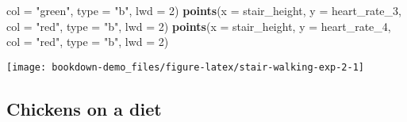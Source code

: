 \documentclass[]{book}
\newenvironment{Shaded}{\begin{snugshade}}{\end{snugshade}}
\newcommand{\DataTypeTok}[1]{\textcolor[rgb]{0.13,0.29,0.53}{#1}}
\newcommand{\DecValTok}[1]{\textcolor[rgb]{0.00,0.00,0.81}{#1}}
\newcommand{\KeywordTok}[1]{\textcolor[rgb]{0.13,0.29,0.53}{\textbf{#1}}}
\newcommand{\NormalTok}[1]{#1}
\newcommand{\StringTok}[1]{\textcolor[rgb]{0.31,0.60,0.02}{#1}}
\begin{document}
\begin{Shaded}
\begin{Highlighting}[]
    \DataTypeTok{col =} \StringTok{"green"}\NormalTok{,}
    \DataTypeTok{type =} \StringTok{"b"}\NormalTok{,}
    \DataTypeTok{lwd =} \DecValTok{2}\NormalTok{)}
\KeywordTok{points}\NormalTok{(}\DataTypeTok{x =}\NormalTok{ stair_height,}
    \DataTypeTok{y =}\NormalTok{ heart_rate_}\DecValTok{3}\NormalTok{,}
    \DataTypeTok{col =} \StringTok{"red"}\NormalTok{,}
    \DataTypeTok{type =} \StringTok{"b"}\NormalTok{,}
    \DataTypeTok{lwd =} \DecValTok{2}\NormalTok{)}
\KeywordTok{points}\NormalTok{(}\DataTypeTok{x =}\NormalTok{ stair_height,}
    \DataTypeTok{y =}\NormalTok{ heart_rate_}\DecValTok{4}\NormalTok{,}
    \DataTypeTok{col =} \StringTok{"red"}\NormalTok{,}
    \DataTypeTok{type =} \StringTok{"b"}\NormalTok{,}
    \DataTypeTok{lwd =} \DecValTok{2}\NormalTok{)}
\end{Highlighting}
\end{Shaded}

\begin{center}\texttt{[image: bookdown-demo\_files/figure-latex/stair-walking-exp-2-1]} \end{center}

\hypertarget{chickens-on-a-diet-1}{%
\subsection{Chickens on a diet}\label{chickens-on-a-diet-1}}
\end{document}
